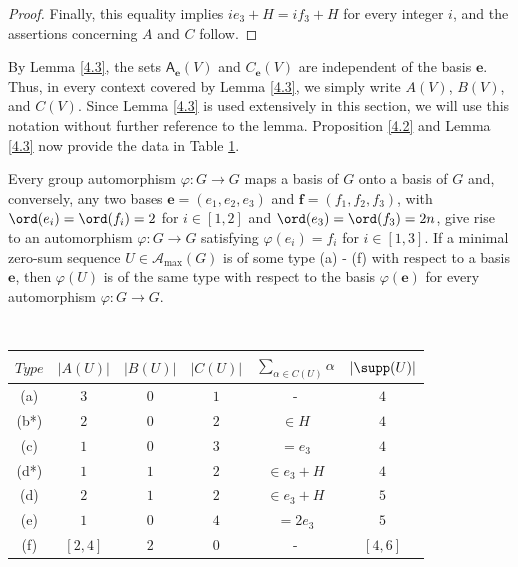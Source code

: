\documentclass[a4paper, 10pt]{amsart}
\theoremstyle{plain}
\theoremstyle{definition}
\numberwithin{equation}{section}
\begin{document}
{\begin{proof}
	Finally, this equality implies $ie_3+H=if_3+H$ for every integer $i$, and the assertions concerning $A$ and $C$ follow.
\end{proof}


By Lemma \ref{4.3}, the sets $\mathsf A_{\boldsymbol e} (V)$ and $C_{\boldsymbol e} (V)$ are independent of the basis $\boldsymbol e$. Thus, in every context covered by Lemma \ref{4.3}, we simply write $A(V)$, $B(V)$, and $C(V)$. Since Lemma \ref{4.3} is used extensively in this section, we will use this notation without further reference to the lemma. Proposition \ref{4.2} and Lemma \ref{4.3} now provide the data in Table \ref{BOX1}.

Every group automorphism $\varphi \colon G \to G$ maps a basis of $G$ onto a basis of $G$ and, conversely, any two bases $\boldsymbol e = (e_1, e_2, e_3)$ and $\boldsymbol f = (f_1,f_2,f_3)$, with $\ord (e_i)=\ord (f_i)=2$ for $i \in [1,2]$ and $\ord (e_3)=\ord (f_3)=2n$, give rise to an automorphism $\varphi \colon G \to G$ satisfying $\varphi (e_i)=f_i$ for $i \in [1,3]$. If a minimal zero-sum sequence $U \in \mathcal A_{\max} (G)$ is of some type (a) - (f) with respect to a basis $\boldsymbol e$, then $\varphi (U)$ is of the same type with respect to the basis $\varphi (\boldsymbol e)$ for every automorphism $\varphi \colon G \to G$. 





	\begin{table}
		\centering
		\caption{~}
		\label{BOX1}
		
\begin{tabular}{|c|c|c|c|c|c|}
			\hline
			$Type$
			& $|A(U)|$ & $|B(U)|$ & $|C(U)| $ & $\sum_{\alpha \in C(U)} \alpha$ & $|\supp (U)|$   \\
			\hline
			(a)
			& $3$ & $0$ & $1$ & - & $4$   \\
			\hline
			(b*)
			& $2$ & $0$ & $2$ &   $\in H$ & $4$    \\
			\hline
			(c)
			& $1$ & $0$ & $3$ &  $= e_3$ & $4$    \\
			\hline
			(d*)
			& $1$ & $1$ & $2$ &  $\in e_3+H$ & $4$   \\
			\hline
			(d)
			& $2$ & $1$ & $2$ &  $\in e_3+H$ & $5$   \\
			\hline
			(e)
			& $1$ & $0$ & $4$ &  $= 2e_3$ & $5$   \\
			\hline
			(f)
			& $[2,4]$ & $2$ & $0$ & - & $[4,6]$ \\
			\hline
		\end{tabular}
		

\end{table}}
\end{document}
